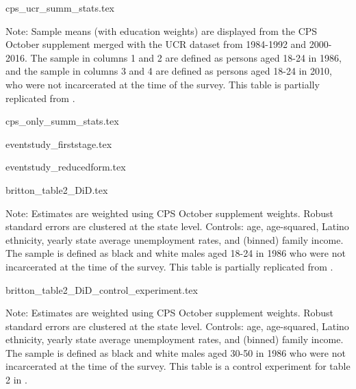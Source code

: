 
{cps_ucr_summ_stats.tex}

\begin{footnotesize}
  \noindent Note: Sample means (with education weights) are displayed from the CPS October supplement merged with the UCR dataset from 1984-1992 and 2000-2016. The sample in columns 1 and 2 are defined as persons aged 18-24 in 1986, and the sample in columns 3 and 4 are defined as persons aged 18-24 in 2010, who were not incarcerated at the time of the survey. This table is partially replicated from \cite{britton2022}.
\end{footnotesize}

{cps_only_summ_stats.tex}
\clearpage


{eventstudy_firststage.tex}

\clearpage

{eventstudy_reducedform.tex}

\clearpage

{britton_table2_DiD.tex}
\begin{footnotesize}
  \noindent Note: Estimates are weighted using CPS October supplement weights. Robust standard errors are clustered at the state level. Controls: age, age-squared, Latino ethnicity, yearly state average unemployment rates, and (binned) family income. The sample is defined as black and white males aged 18-24 in 1986 who were not incarcerated at the time of the survey.
  This table is partially replicated from \cite{britton2022}.
\end{footnotesize}

{britton_table2_DiD_control_experiment.tex}
\begin{footnotesize}
  \noindent Note: Estimates are weighted using CPS October supplement weights. Robust standard errors are clustered at the state level. Controls: age, age-squared, Latino ethnicity, yearly state average unemployment rates, and (binned) family income. The sample is defined as black and white males aged 30-50 in 1986 who were not incarcerated at the time of the survey.
  This table is a control experiment for table 2 in \cite{britton2022}.
\end{footnotesize}
\clearpage

